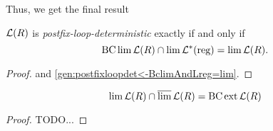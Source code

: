 Thus, we get the final result
\begin{theorem}
\label{gen:postfix-loop-det=limAndBclim}
$\mathcal{L}(R)$ is \emph{postfix-loop-deterministic} exactly if and only if
\[ \operatorname{BC} \lim \mathcal{L}(R) \cap \lim \mathcal{L}^*(\text{reg}) = \lim \mathcal{L}(R) . \]
\begin{proof}
 and \cref{gen:postfixloopdet<-BclimAndLreg=lim}.
\end{proof}
\end{theorem}

\begin{lemma}
\label{gen:R-staiger-wagner}
\[ \lim \mathcal{L}(R) \cap \operatorname{\overline{lim}} \mathcal{L}(R) = \operatorname{BC} \operatorname{ext} \mathcal{L}(R) \]
\begin{proof}
TODO...
\end{proof}
\end{lemma}




